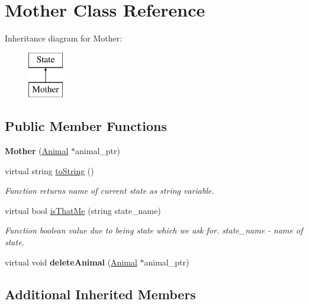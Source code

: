 \hypertarget{class_mother}{}\section{Mother Class Reference}
\label{class_mother}
Inheritance diagram for Mother\+:\begin{figure}[H]
\begin{center}
\leavevmode
\includegraphics[height=2.000000cm]{class_mother}
\end{center}
\end{figure}
\subsection*{Public Member Functions}
\begin{DoxyCompactItemize}
\item 
\hypertarget{class_mother_a0c325979202669fa40f22b067554f92c}{}{\bfseries Mother} (\hyperlink{class_animal}{Animal} $\ast$animal\+\_\+ptr)\label{class_mother_a0c325979202669fa40f22b067554f92c}

\item 
virtual string \hyperlink{class_mother_a47c6ce820d67f3dc4d40ac39c495ef62}{to\+String} ()
\begin{DoxyCompactList}\small\item\em Function returns name of current state as string variable. \end{DoxyCompactList}\item 
virtual bool \hyperlink{class_mother_ac5a9fcd972ae6ef6fab71038d8ab3939}{is\+That\+Me} (string state\+\_\+name)
\begin{DoxyCompactList}\small\item\em Function boolean value due to being state which we ask for.  state\+\_\+name -\/ name of state. \end{DoxyCompactList}\item 
\hypertarget{class_mother_ab36cb00a4f8bfb082b7d684ed19dd5d6}{}virtual void {\bfseries delete\+Animal} (\hyperlink{class_animal}{Animal} $\ast$animal\+\_\+ptr)\label{class_mother_ab36cb00a4f8bfb082b7d684ed19dd5d6}

\end{DoxyCompactItemize}
\subsection*{Additional Inherited Members}


